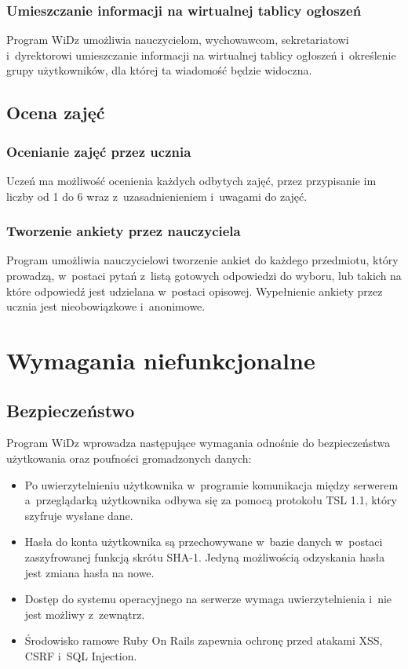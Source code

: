\documentclass[12pt,leqno,twoside]{mwart}
\begin{document}
\subsubsection{Umieszczanie informacji na wirtualnej tablicy ogłoszeń}
\noindent Program WiDz umożliwia nauczycielom, wychowawcom, sekretariatowi i~dyrektorowi umieszczanie informacji na wirtualnej tablicy ogłoszeń i~określenie grupy użytkowników, dla której ta wiadomość będzie widoczna.

\subsection{Ocena zajęć}
\subsubsection{Ocenianie zajęć przez ucznia}
\noindent Uczeń ma możliwość ocenienia każdych odbytych zajęć, przez przypisanie im liczby od 1 do 6 wraz z~uzasadnienieniem i~uwagami do zajęć.

\subsubsection{Tworzenie ankiety przez nauczyciela}
\noindent Program umożliwia nauczycielowi tworzenie ankiet do każdego przedmiotu, który prowadzą, w~postaci pytań z~listą gotowych odpowiedzi do wyboru, lub takich na które odpowiedź jest udzielana w~postaci opisowej. Wypełnienie ankiety przez ucznia jest nieobowiązkowe i~anonimowe.

\section{Wymagania niefunkcjonalne}
\subsection{Bezpieczeństwo}
\noindent Program WiDz wprowadza następujące wymagania odnośnie do bezpieczeństwa użytkowania oraz poufności gromadzonych danych:
\begin{itemize}
	\item Po uwierzytelnieniu użytkownika w~programie komunikacja między serwerem a~przeglądarką użytkownika odbywa się za pomocą protokołu TSL 1.1, który szyfruje wysłane dane.
	\item Hasła do konta użytkownika są przechowywane w~bazie danych w~postaci zaszyfrowanej funkcją skrótu SHA-1. Jedyną możliwością odzyskania hasła jest zmiana hasła na nowe.
	\item Dostęp do systemu operacyjnego na serwerze wymaga uwierzytelnienia i~nie jest możliwy z~zewnątrz.
	\item Środowisko ramowe Ruby On Rails zapewnia ochronę przed atakami XSS, CSRF i~SQL Injection.
\end{itemize}
\end{document}
